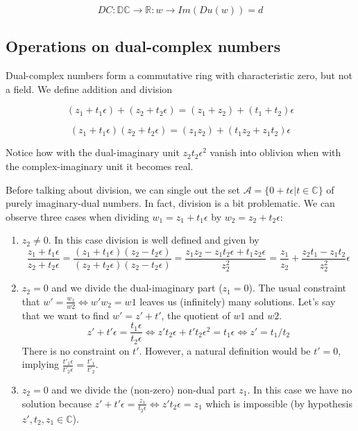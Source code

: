 \documentclass{article}
\newcommand{\R}{\mathbb{R}}
\newcommand{\C}{\mathbb{C}}
\newcommand{\DC}{\mathbb{DC}}
\newcommand{\A}{\mathcal{A}}
\newcommand{\e}{\epsilon}
\begin{document}
\begin{equation}
DC: \DC \to \R: w \to Im(Du(w)) = d
\end{equation}

\subsection{Operations on dual-complex numbers}

Dual-complex numbers form a commutative ring with characteristic zero, but not a field. We define addition and division

\begin{equation}
(z_1 + t_1 \e) + (z_2 + t_2 \e) = (z_1 + z_2) + (t_1 + t_2) \e
\end{equation}

\begin{equation}
(z_1 + t_1 \e) (z_2 + t_2 \e) = (z_1 z_2) + (t_1 z_2 + z_1 t_2) \e
\end{equation}

Notice how with the dual-imaginary unit $z_2 t_2 \e^2$ vanish into oblivion when with the complex-imaginary unit it becomes real.

Before talking about division, we can single out the set $\A = \{0 + t \e | t \in \C\}$ of purely imaginary-dual numbers. In fact, division is a bit problematic. We can observe three cases when dividing $w_1 = z_1 + t_1 \e$ by $w_2 = z_2 + t_2 \e$:

\begin{enumerate}
        \item $z_2 \neq 0$. In this case division is well defined and given by
        \begin{equation}
        \frac{z_1 + t_1 \e}{z_2 + t_2 \e} = \frac{(z_1 + t_1 \e)(z_2 - t_2 \e)}{(z_2 + t_2 \e)(z_2 - t_2 \e)} = \frac{z_1 z_2 - z_1 t_2 \e + t_1 z_2 \e}{z_2^2} = \frac{z_1}{z_2} + \frac{z_2 t_1 - z_1 t_2 }{z_2^2} \e
        \end{equation}
        \item $z_2 = 0$ and we divide the dual-imaginary part ($z_1 = 0$). The usual constraint that $w' = \frac{w_1}{w2} \iff w'w_2 = w1$ leaves us (infinitely) many solutions. Let's say that we want to find $w' = z' + t'$, the quotient of $w1$ and $w2$.
        \begin{equation}
        z' + t' \e = \frac{t_1 \e}{t_2 \e} \iff z' t_2 \e + t' t_2 \e^2 = t_1 \e \iff z' = t_1/t_2
        \end{equation}
        There is no constraint on $t'$. However, a natural definition would be $t' = 0$, implying $\frac{t'_1 \e}{t'_2 \e} = \frac{t'_1}{t'_2}$.
        \item $z_2 = 0$ and we divide the (non-zero) non-dual part $z_1$. In this case we have no solution because $z' + t'\e = \frac{z_1}{t_2 \e} \iff z' t_2 \e = z_1$ which is impossible (by hypothesis $z', t_2, z_1 \in \C$).
\end{enumerate}
\end{document}
